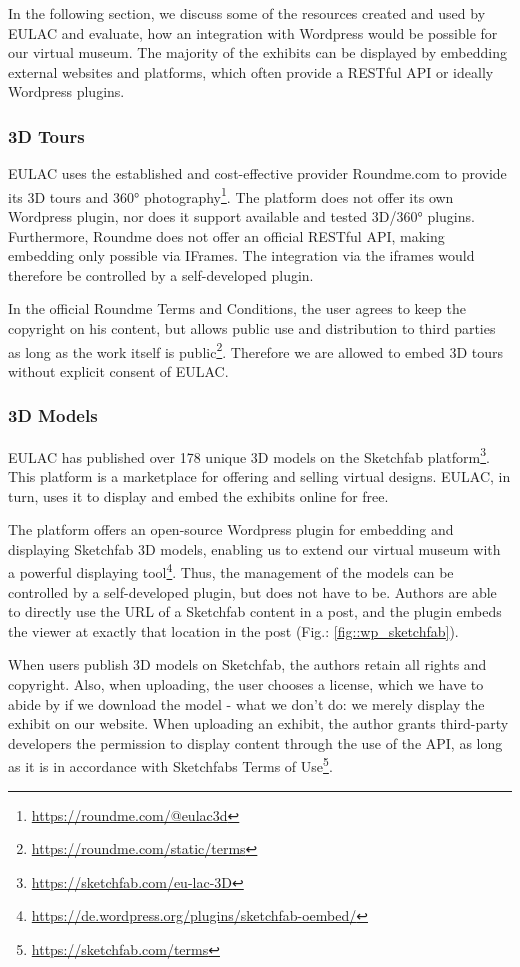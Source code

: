 In the following section, we discuss some of the resources created and used by EULAC and evaluate, how an integration with Wordpress would be possible for our virtual museum. The majority of the exhibits can be displayed by embedding external websites and platforms, which often provide a RESTful API or ideally Wordpress plugins.

\subsubsection{3D Tours}

EULAC uses the established and cost-effective provider Roundme.com to provide its 3D tours and 360° photography\footnote{\url{https://roundme.com/@eulac3d}}. The platform does not offer its own Wordpress plugin, nor does it support available and tested 3D/360° plugins. Furthermore, Roundme does not offer an official RESTful API, making embedding only possible via IFrames. The integration via the iframes would therefore be controlled by a self-developed plugin.

In the official Roundme Terms and Conditions, the user agrees to keep the copyright on his content, but allows public use and distribution to third parties as long as the work itself is public\footnote{\url{https://roundme.com/static/terms}}. Therefore we are allowed to embed 3D tours without explicit consent of EULAC. 


\subsubsection{3D Models}

EULAC has published over 178 unique 3D models on the Sketchfab platform\footnote{\url{https://sketchfab.com/eu-lac-3D}}. This platform is a marketplace for offering and selling virtual designs. EULAC, in turn, uses it to display and embed the exhibits online for free. 

The platform offers an open-source Wordpress plugin for embedding and displaying Sketchfab 3D models, enabling us to extend our virtual museum with a powerful displaying tool\footnote{\url{https://de.wordpress.org/plugins/sketchfab-oembed/}}. Thus, the management of the models can be controlled by a self-developed plugin, but does not have to be. Authors are able to directly use the URL of a Sketchfab content in a post, and the plugin embeds the viewer at exactly that location in the post (Fig.: \ref{fig::wp_sketchfab}). 

When users publish 3D models on Sketchfab, the authors retain all rights and copyright. Also, when uploading, the user chooses a license, which we have to abide by if we download the model - what we don't do: we merely display the exhibit on our website. When uploading an exhibit, the author grants third-party developers the permission to display content through the use of the API, as long as it is in accordance with Sketchfabs Terms of Use\footnote{\url{https://sketchfab.com/terms}}.



